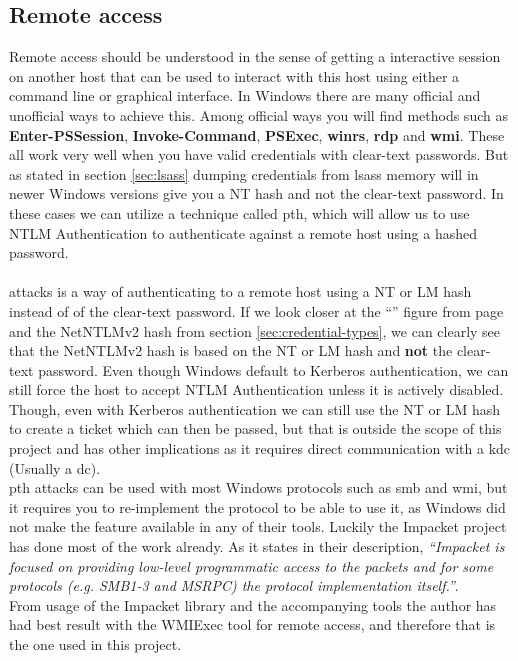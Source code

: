 \documentclass{article}
\begin{document}
\subsection{Remote access}
\label{sec:remote-access}
Remote access should be understood in the sense of getting a interactive session on another host that can be used to interact with this host using either a command line or graphical interface. In Windows there are many official and unofficial ways to achieve this. Among official ways you will find methods such as \textbf{Enter-PSSession}, \textbf{Invoke-Command}, \textbf{PSExec}, \textbf{\gls{winrs}}, \textbf{\gls{rdp}} and \textbf{\gls{wmi}}. These all work very well when you have valid credentials with clear-text passwords. But as stated in section \ref{sec:lsass} dumping credentials from \gls{lsass} memory will in newer Windows versions give you a NT hash and not the clear-text password. In these cases we can utilize a technique called \gls{pth}, which will allow us to use NTLM Authentication to authenticate against a remote host using a hashed password.
\paragraph{}
 attacks is a way of authenticating to a remote host using a NT or LM hash instead of of the clear-text password. If we look closer at the \enquote{} figure from page \pageref{fig:ntlm-authenticate-message} and the NetNTLMv2 hash from section \ref{sec:credential-types}, we can clearly see that the NetNTLMv2 hash is based on the NT or LM hash and \textbf{not} the clear-text password. Even though Windows default to Kerberos authentication, we can still force the host to accept NTLM Authentication unless it is actively disabled. Though, even with Kerberos authentication we can still use the NT or LM hash to create a ticket which can then be passed, but that is outside the scope of this project and has other implications as it requires direct communication with a \gls{kdc} (Usually a \gls{dc}).
\\
\gls{pth} attacks can be used with most Windows protocols such as \gls{smb} and \gls{wmi}, but it requires you to re-implement the protocol to be able to use it, as Windows did not make the feature available in any of their tools. Luckily the Impacket project has done most of the work already. As it states in their description, \emph{\enquote{Impacket is focused on providing low-level programmatic access to the packets and for some protocols (e.g. SMB1-3 and MSRPC) the protocol implementation itself.}}\cite{url:impacket:github}.
\\
From usage of the Impacket library and the accompanying tools the author has had best result with the WMIExec tool for remote access, and therefore that is the one used in this project.
\end{document}
